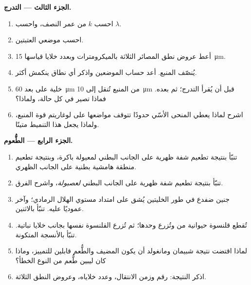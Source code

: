 \begin{problem}
\medskip
\noindent\textbf{الجزء الثالث --- التدرج.}
\begin{enumerate}[resume]
  \item احسب $k$ من عمر النصف، واحسب $\lambda$.
  \item احسب موضعي العتبتين.
  \item أعط عروض نطق المصائر الثلاثة بالميكرومترات وبعدد
        خلايا قياسها \qty{15}{\micro m}.
  \item يُنصّف المنبع. أعد حساب الموضعين واذكر
        أي نطاق ينكمش أكثر.
  \item خلية على بعد \qty{60}{\micro m} من المنبع تُنقل إلى
        \qty{10}{\micro m} قبل أن يُقرأ التدرج؛ ثم بعده.
        فماذا تصير في كل حالة، ولماذا؟
  \item اشرح لماذا يعطي المنحى الأسّي حدودًا تتوقف
        مواضعها على لوغاريتم قوة المنبع،
        ولماذا يجعل هذا التنميط متينًا.
\end{enumerate}

\medskip
\noindent\textbf{الجزء الرابع --- الطُّعوم.}
\begin{enumerate}[resume]
  \item تنبّأ بنتيجة تطعيم شفة ظهرية على الجانب البطني
        لمعيولة باكرة، وبنتيجة تطعيم منطقة هامشية بطنية
        على الجانب الظهري.
  \item تنبّأ بنتيجة تطعيم شفة ظهرية على الجانب البطني
        \emph{لعصبولة}، واشرح الفرق.
  \item جنين ضفدع في طور الخليتين يُشق على امتداد مستوي
        الهلال الرمادي؛ وآخر عموديًا عليه. تنبّأ
        بالاثنين.
  \item تُقطع قلنسوة حيوانية من  وتُزرع وحدها؛ ثم
        تُزرع القلنسوة نفسها بجانب خلايا نباتية. تنبّأ
        بالأنسجة المتكونة.
  \item لماذا اقتضت نتيجة شبيمان ومانغولد أن يكون المضيف
        والطُّعم قابلين للتمييز، وماذا كان ليبين طُّعم من
        النوع الخطأ؟
  \item اذكر النتيجة: رقم  وزمن الانتقال،
        وعدد خلاياه، وعروض النطق الثلاثة.
\end{enumerate}
\end{problem}
